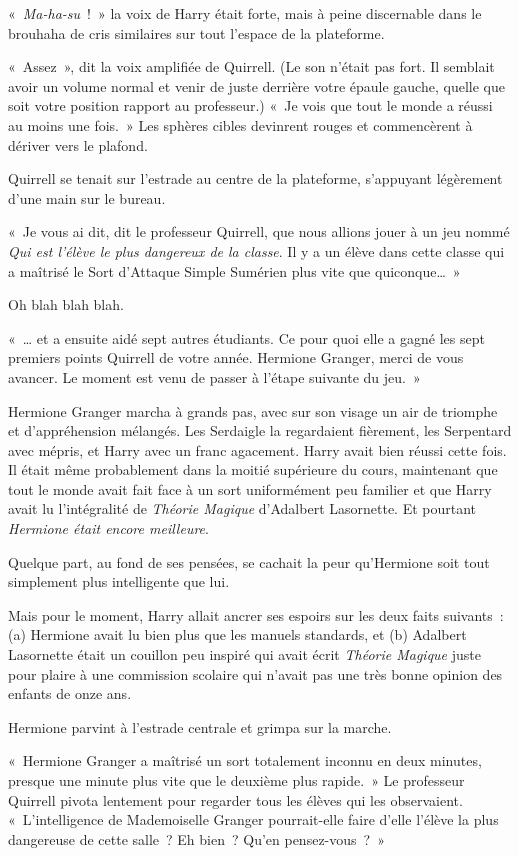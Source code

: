 «~\emph{Ma-ha-su}~!~» la voix de Harry était forte, mais à peine discernable dans le brouhaha de cris similaires sur tout l'espace de la plateforme.

«~Assez~», dit la voix amplifiée de Quirrell.
(Le son n'était pas fort. Il semblait avoir un volume normal et venir de juste derrière votre épaule gauche, quelle que soit votre position rapport au professeur.)
«~Je vois que tout le monde a réussi au moins une fois.~»
Les sphères cibles devinrent rouges et commencèrent à dériver vers le plafond.

Quirrell se tenait sur l'estrade au centre de la plateforme, s'appuyant légèrement d'une main sur le bureau.

«~Je vous ai dit, dit le professeur Quirrell, que nous allions jouer à un jeu nommé \emph{Qui est l'élève le plus dangereux de la classe}. Il y a un élève dans cette classe qui a maîtrisé le Sort d'Attaque Simple Sumérien plus vite que quiconque…~»

Oh blah blah blah.

«~… et a ensuite aidé sept autres étudiants. Ce pour quoi elle a gagné les sept premiers points Quirrell de votre année. Hermione Granger, merci de vous avancer. Le moment est venu de passer à l'étape suivante du jeu.~»

Hermione Granger marcha à grands pas, avec sur son visage un air de triomphe et d'appréhension mélangés. Les Serdaigle la regardaient fièrement, les Serpentard avec mépris, et Harry avec un franc agacement. Harry avait bien réussi cette fois. Il était même probablement dans la moitié supérieure du cours, maintenant que tout le monde avait fait face à un sort uniformément peu familier et que Harry avait lu l'intégralité de \emph{Théorie Magique} d'Adalbert Lasornette. Et pourtant \emph{Hermione était encore meilleure}.

Quelque part, au fond de ses pensées, se cachait la peur qu'Hermione soit tout simplement plus intelligente que lui.

Mais pour le moment, Harry allait ancrer ses espoirs sur les deux faits suivants~: (a) Hermione avait lu bien plus que les manuels standards, et (b) Adalbert Lasornette était un couillon peu inspiré qui avait écrit \emph{Théorie Magique} juste pour plaire à une commission scolaire qui n'avait pas une très bonne opinion des enfants de onze ans.

Hermione parvint à l'estrade centrale et grimpa sur la marche.

«~Hermione Granger a maîtrisé un sort totalement inconnu en deux minutes, presque une minute plus vite que le deuxième plus rapide.~» Le professeur Quirrell pivota lentement pour regarder tous les élèves qui les observaient. «~L'intelligence de Mademoiselle Granger pourrait-elle faire d'elle l'élève la plus dangereuse de cette salle~? Eh bien~? Qu'en pensez-vous~?~»

